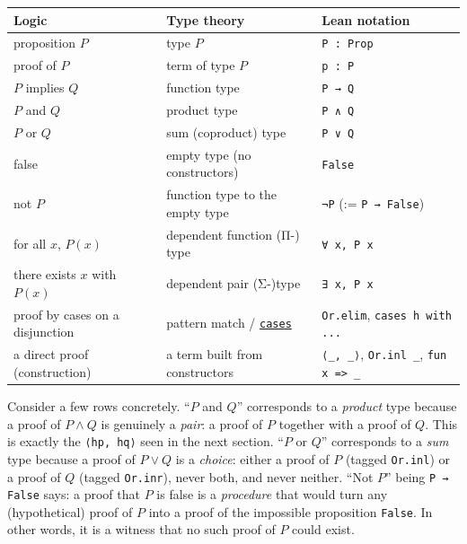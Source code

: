 {\small\begin{tabular}{
  >{\raggedright\arraybackslash}p{}
  >{\raggedright\arraybackslash}p{}
  >{\raggedright\arraybackslash}p{}
}
\toprule
Logic & Type theory & Lean notation \\
\midrule
proposition \(P\) & type \(P\) & \texttt{P : Prop} \\
proof of \(P\) & term of type \(P\) & \texttt{p : P} \\
\(P\) implies \(Q\) & function type & \texttt{P → Q} \\
\(P\) and \(Q\) & product type & \texttt{P ∧ Q} \\
\(P\) or \(Q\) & sum (coproduct) type & \texttt{P ∨ Q} \\
false & empty type (no constructors) & \texttt{False} \\
not \(P\) & function type to the empty type & \texttt{¬P} (:= \texttt{P → False}) \\
for all \(x\), \(P(x)\) & dependent function (Π-) type & \texttt{∀ x, P x} \\
there exists \(x\) with \(P(x)\) & dependent pair (Σ-)type & \texttt{∃ x, P x} \\
proof by cases on a disjunction & pattern match / \href{https://lean-lang.org/doc/reference/latest/Tactic-Proofs/Tactic-Reference/}{\texttt{cases}} & \texttt{Or.elim}, \texttt{cases h with ...} \\
a direct proof (construction) & a term built from constructors & \texttt{⟨\_\allowbreak{}, \_\allowbreak{}⟩}, \texttt{Or.inl \_\allowbreak{}}, \texttt{fun x => \_\allowbreak{}} \\
\bottomrule
\end{tabular}}


Consider a few rows concretely. ``\(P\) and \(Q\)'' corresponds to a \emph{product} type because a proof of \(P \wedge Q\) is genuinely a \emph{pair}: a proof of \(P\) together with a proof of \(Q\). This is exactly the \texttt{⟨hp, hq⟩} seen in the next section. ``\(P\) or \(Q\)'' corresponds to a \emph{sum} type because a proof of \(P \vee Q\) is a \emph{choice}: either a proof of \(P\) (tagged \texttt{Or.inl}) or a proof of \(Q\) (tagged \texttt{Or.inr}), never both, and never neither. ``Not \(P\)'' being \texttt{P → False} says: a proof that \(P\) is false is a \emph{procedure} that would turn any (hypothetical) proof of \(P\) into a proof of the impossible proposition \texttt{False}. In other words, it is a witness that no such proof of \(P\) could exist.

